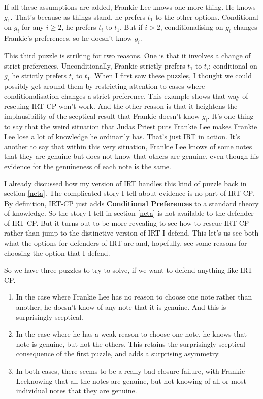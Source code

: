 \documentclass[11pt,]{book}
\providecommand{\tightlist}{%
  \setlength{\itemsep}{0pt}\setlength{\parskip}{0pt}}
\begin{document}
If all these assumptions are added, Frankie Lee knows one more thing. He knows \(g_1\). That's because as things stand, he prefers \(t_1\) to the other options. Conditional on \(g_i\) for any \(i \geq 2\), he prefers \(t_i\) to \(t_1\). But if \(i > 2\), conditionalising on \(g_i\) changes Frankie's preferences, so he doesn't know \(g_i\).

This third puzzle is striking for two reasons. One is that it involves a change of strict preferences. Unconditionally, Frankie strictly prefers \(t_1\) to \(t_i\); conditional on \(g_i\) he strictly prefers \(t_i\) to \(t_1\). When I first saw these puzzles, I thought we could possibly get around them by restricting attention to cases where conditionalisation changes a strict preference. This example shows that way of rescuing IRT-CP won't work. And the other reason is that it heightens the implausibility of the sceptical result that Frankie doesn't know \(g_i\). It's one thing to say that the weird situation that Judas Priest puts Frankie Lee makes Frankie Lee lose a lot of knowledge he ordinarily has. That's just IRT in action. It's another to say that within this very situation, Frankie Lee knows of some notes that they are genuine but does not know that others are genuine, even though his evidence for the genuineness of each note is the same.

I already discussed how my version of IRT handles this kind of puzzle back in section \ref{neta}. The complicated story I tell about evidence is no part of IRT-CP. By definition, IRT-CP just adds \textbf{Conditional Preferences} to a standard theory of knowledge. So the story I tell in section \ref{neta} is not available to the defender of IRT-CP. But it turns out to be more revealing to see how to rescue IRT-CP rather than jump to the distinctive version of IRT I defend. This let's us see both what the options for defenders of IRT are and, hopefully, see some reasons for choosing the option that I defend.

So we have three puzzles to try to solve, if we want to defend anything like IRT-CP.

\begin{enumerate}
\def\labelenumi{\arabic{enumi}.}
\tightlist
\item
  In the case where Frankie Lee has no reason to choose one note rather than another, he doesn't know of any note that it is genuine. And this is surprisingly sceptical.
\item
  In the case where he has a weak reason to choose one note, he knows that note is genuine, but not the others. This retains the surprisingly sceptical consequence of the first puzzle, and adds a surprising asymmetry.
\item
  In both cases, there seems to be a really bad closure failure, with Frankie Leeknowing that all the notes are genuine, but not knowing of all or most individual notes that they are genuine.
\end{enumerate}
\end{document}
